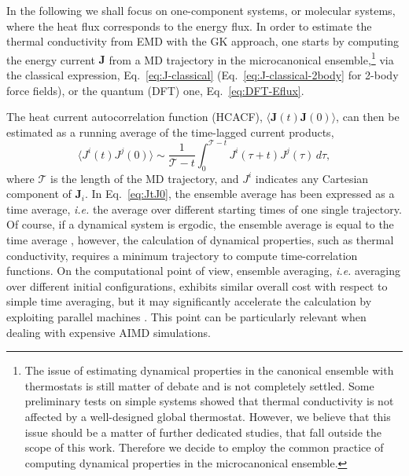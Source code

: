 \begin{LEtext}
In the following we shall focus on one-component systems, or molecular systems, where the heat flux corresponds to the energy flux. 
In order to estimate the thermal conductivity from EMD with the GK approach, one starts by computing the energy current $\mathbf{J}$ from a MD trajectory in the microcanonical ensemble,\footnote{The issue of estimating dynamical properties in the canonical ensemble with thermostats is still matter of debate and is not completely settled. Some preliminary tests on simple systems showed that thermal conductivity is not affected by a well-designed global thermostat. However, we believe that this issue should be a matter of further dedicated studies, that fall outside the scope of this work. Therefore we decide to employ the common practice of computing dynamical properties in the microcanonical ensemble.} 
via the classical expression, Eq.~\eqref{eq:J-classical} (Eq.~\eqref{eq:J-classical-2body} for 2-body force fields), or the quantum (DFT) one, Eq.~\eqref{eq:DFT-Eflux}.

The heat current autocorrelation function (HCACF), $\langle\mathbf{J}(t)\mathbf{J}(0)\rangle$, can then be estimated as a running average of the time-lagged current products, 
\begin{equation}
    \langle J^i(t) J^j(0)\rangle \sim \frac{1}{\mathcal{T}-t} \int_0^{\mathcal{T}-t} J^i(\tau+t) J^j(\tau) \, d\tau , \label{eq:JtJ0}
\end{equation}
where $\mathcal{T}$ is the length of the MD trajectory, and $J^i$ indicates any Cartesian component of $\mathbf{J}_i$. 
In Eq.~\eqref{eq:JtJ0}, the ensemble average has been expressed as a time average, \emph{i.e.} the average over different starting times of one single trajectory. Of course, if a dynamical system is ergodic, the ensemble average is equal to the time average \cite{Frenkel2001}, however, the calculation of dynamical properties, such as thermal conductivity, requires a minimum trajectory to compute time-correlation functions. On the computational point of view, ensemble averaging, \emph{i.e.} averaging over different initial configurations, exhibits similar overall cost with respect to simple time averaging, but it may significantly accelerate the calculation by exploiting parallel machines \cite{Gordiz2015}. This point can be particularly relevant when dealing with expensive AIMD simulations.



\end{LEtext}
